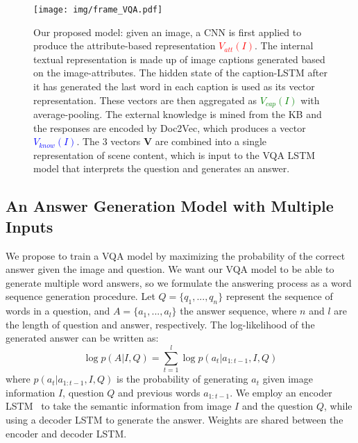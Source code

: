 \documentclass[10pt,journal,compsoc]{IEEEtran}
\def\Att{{V_{att}}}
\def\Cap{{V_{cap}}}
\def\Know{{V_{know}}}
\begin{document}
\begin{figure*}[t!]
\begin{center}
\texttt{[image: img/frame\_VQA.pdf]}
\end{center}
\vspace{-10pt}
   \caption{Our proposed model: given an image, a CNN is first applied to produce the attribute-based representation \textcolor{red}{$\Att(I)$}. The internal textual representation is made up of image captions generated based on the image-attributes.
The hidden state of the caption-LSTM after it has generated the last word in each caption is used as its vector representation. These vectors are then aggregated as \textcolor{green}{$\Cap(I)$} with average-pooling. The external knowledge is mined from the KB and the responses are encoded by Doc2Vec, which produces a vector \textcolor{blue}{$\Know(I)$}. The 3 vectors $\mathbf{V}$ are combined into a single representation of scene content, which is input to the VQA LSTM model that interprets the question and generates an answer.
   }
   \label{frame}
   \vspace{-10pt}
\end{figure*}


\vspace{-10pt}
\subsection{An Answer Generation Model with Multiple Inputs}
We propose to train a VQA model by maximizing the probability of the correct answer given the image and question. We want our VQA model to be able to generate multiple word answers, so we formulate the answering process as a word sequence generation procedure. Let $Q=\{q_1,...,q_n\}$ represent the sequence of words in a question, and $A=\{a_1,...,a_l\}$ the answer sequence, where $n$ and $l$ are the length of question and answer, respectively. The log-likelihood of the generated answer can be written as: 
\begin{equation}
    \log p(A|I,Q)=\sum_{t=1}^l \log p(a_{t}|a_{1:t-1},I,Q)  
\end{equation}
where $p(a_t|a_{1:t-1},I,Q)$ is the probability of generating $a_t$ given image information $I$, question $Q$ and previous words $a_{1:t-1}$. We employ an encoder LSTM~\cite{hochreiter1997long} to take the semantic information from image $I$ and the question $Q$, while using a decoder LSTM to generate the answer. Weights are shared between the encoder and decoder LSTM.
\end{document}
